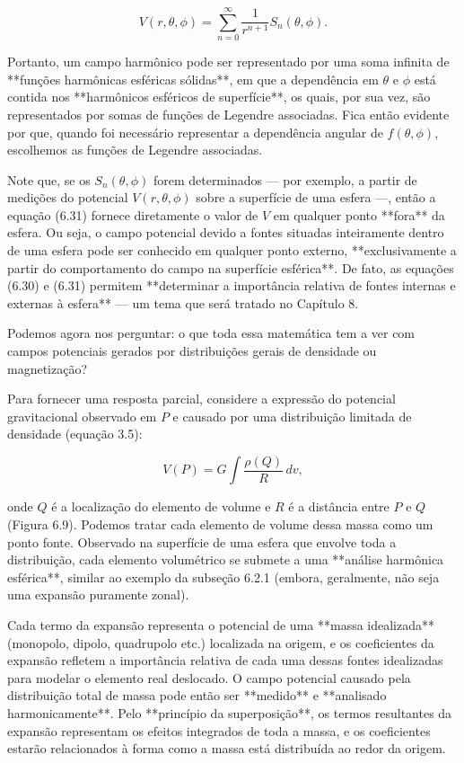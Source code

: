 $$
V(r, \theta, \phi) = \sum_{n=0}^{\infty} \frac{1}{r^{n+1}} S_n(\theta, \phi). \tag{6.31}
$$

Portanto, um campo harmônico pode ser representado por uma soma infinita de **funções harmônicas esféricas sólidas**, em que a dependência em $\theta$ e $\phi$ está contida nos **harmônicos esféricos de superfície**, os quais, por sua vez, são representados por somas de funções de Legendre associadas. Fica então evidente por que, quando foi necessário representar a dependência angular de $f(\theta, \phi)$, escolhemos as funções de Legendre associadas.

Note que, se os $S_n(\theta, \phi)$ forem determinados — por exemplo, a partir de medições do potencial $V(r, \theta, \phi)$ sobre a superfície de uma esfera —, então a equação (6.31) fornece diretamente o valor de $V$ em qualquer ponto **fora** da esfera. Ou seja, o campo potencial devido a fontes situadas inteiramente dentro de uma esfera pode ser conhecido em qualquer ponto externo, **exclusivamente a partir do comportamento do campo na superfície esférica**. De fato, as equações (6.30) e (6.31) permitem **determinar a importância relativa de fontes internas e externas à esfera** — um tema que será tratado no Capítulo 8.

Podemos agora nos perguntar: o que toda essa matemática tem a ver com campos potenciais gerados por distribuições gerais de densidade ou magnetização?

Para fornecer uma resposta parcial, considere a expressão do potencial gravitacional observado em $P$ e causado por uma distribuição limitada de densidade (equação 3.5):

$$
V(P) = G \int \frac{\rho(Q)}{R} \, dv,
$$

onde $Q$ é a localização do elemento de volume e $R$ é a distância entre $P$ e $Q$ (Figura 6.9). Podemos tratar cada elemento de volume dessa massa como um ponto fonte. Observado na superfície de uma esfera que envolve toda a distribuição, cada elemento volumétrico se submete a uma **análise harmônica esférica**, similar ao exemplo da subseção 6.2.1 (embora, geralmente, não seja uma expansão puramente zonal).

Cada termo da expansão representa o potencial de uma **massa idealizada** (monopolo, dipolo, quadrupolo etc.) localizada na origem, e os coeficientes da expansão refletem a importância relativa de cada uma dessas fontes idealizadas para modelar o elemento real deslocado. O campo potencial causado pela distribuição total de massa pode então ser **medido** e **analisado harmonicamente**. Pelo **princípio da superposição**, os termos resultantes da expansão representam os efeitos integrados de toda a massa, e os coeficientes estarão relacionados à forma como a massa está distribuída ao redor da origem.


